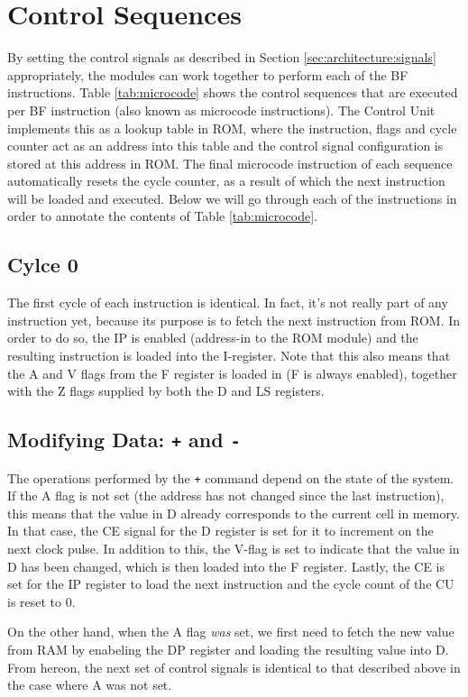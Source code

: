\section{Control Sequences} \label{sec:sequences}
By setting the control signals as described in Section \ref{sec:architecture:signals} appropriately, the modules can work together to perform each of the BF instructions. Table \ref{tab:microcode} shows the control sequences that are executed per BF instruction (also known as microcode instructions). The Control Unit implements this as a lookup table in ROM, where the instruction, flags and cycle counter act as an address into this table and the control signal configuration is stored at this address in ROM. The final microcode instruction of each sequence automatically resets the cycle counter, as a result of which the next instruction will be loaded and executed. Below we will go through each of the instructions in order to annotate the contents of Table \ref{tab:microcode}.

\subsection{Cylce 0}
The first cycle of each instruction is identical. In fact, it's not really part of any instruction yet, because its purpose is to fetch the next instruction from ROM. In order to do so, the IP is enabled (address-in to the ROM module) and the resulting instruction is loaded into the I-register. Note that this also means that the A and V flags from the F register is loaded in (F is always enabled), together with the Z flags supplied by both the D and LS registers.

\subsection{Modifying Data: \texttt{+} and \texttt{-}}
The operations performed by the \texttt{+} command depend on the state of the system. If the A flag is not set (the address has not changed since the last instruction), this means that the value in D already corresponds to the current cell in memory. In that case, the CE signal for the D register is set for it to increment on the next clock pulse. In addition to this, the V-flag is set to indicate that the value in D has been changed, which is then loaded into the F register. Lastly, the CE is set for the IP register to load the next instruction and the cycle count of the CU is reset to 0.

On the other hand, when the A flag \emph{was} set, we first need to fetch the new value from RAM by enabeling the DP register and loading the resulting value into D. From hereon, the next set of control signals is identical to that described above in the case where A was not set.

